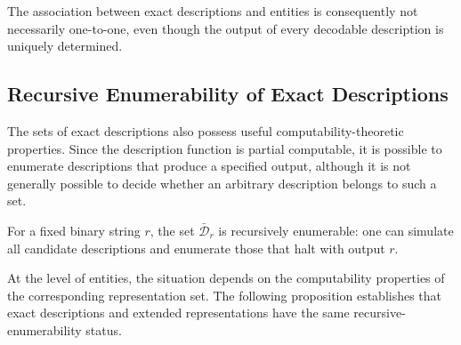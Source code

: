 The association between exact descriptions and entities is consequently not necessarily one-to-one, even though the output of every decodable description is uniquely determined.


\subsection*{Recursive Enumerability of Exact Descriptions}

The sets of exact descriptions also possess useful computability-theoretic properties. Since the description function is partial computable, it is possible to enumerate descriptions that produce a specified output, although it is not generally possible to decide whether an arbitrary description belongs to such a set.

For a fixed binary string $r$, the set $\bar{\mathcal{D}}_r$ is recursively enumerable: one can simulate all candidate descriptions and enumerate those that halt with output $r$.

At the level of entities, the situation depends on the computability properties of the corresponding representation set. The following proposition establishes that exact descriptions and extended representations have the same recursive-enumerability status.

